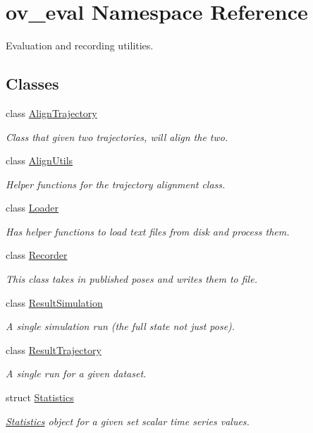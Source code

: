\hypertarget{namespaceov__eval}{}\section{ov\+\_\+eval Namespace Reference}
\label{namespaceov__eval}


Evaluation and recording utilities.  


\subsection*{Classes}
\begin{DoxyCompactItemize}
\item 
class \hyperlink{classov__eval_1_1AlignTrajectory}{Align\+Trajectory}
\begin{DoxyCompactList}\small\item\em Class that given two trajectories, will align the two. \end{DoxyCompactList}\item 
class \hyperlink{classov__eval_1_1AlignUtils}{Align\+Utils}
\begin{DoxyCompactList}\small\item\em Helper functions for the trajectory alignment class. \end{DoxyCompactList}\item 
class \hyperlink{classov__eval_1_1Loader}{Loader}
\begin{DoxyCompactList}\small\item\em Has helper functions to load text files from disk and process them. \end{DoxyCompactList}\item 
class \hyperlink{classov__eval_1_1Recorder}{Recorder}
\begin{DoxyCompactList}\small\item\em This class takes in published poses and writes them to file. \end{DoxyCompactList}\item 
class \hyperlink{classov__eval_1_1ResultSimulation}{Result\+Simulation}
\begin{DoxyCompactList}\small\item\em A single simulation run (the full state not just pose). \end{DoxyCompactList}\item 
class \hyperlink{classov__eval_1_1ResultTrajectory}{Result\+Trajectory}
\begin{DoxyCompactList}\small\item\em A single run for a given dataset. \end{DoxyCompactList}\item 
struct \hyperlink{structov__eval_1_1Statistics}{Statistics}
\begin{DoxyCompactList}\small\item\em \hyperlink{structov__eval_1_1Statistics}{Statistics} object for a given set scalar time series values. \end{DoxyCompactList}\end{DoxyCompactItemize}


